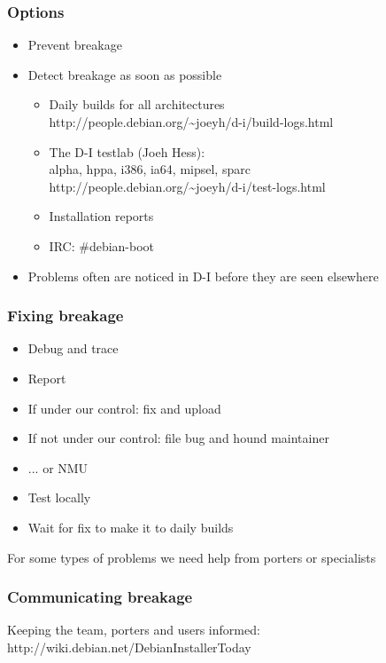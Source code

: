 \documentclass{beamer}
\begin{document}
\begin{frame}
  \frametitle{Options}
	\begin{itemize}[<+->]
	\item
		Prevent breakage
	\item
		Detect breakage as soon as possible
		\begin{itemize}
		\item
			Daily builds for all architectures \\
			http://people.debian.org/\~{}joeyh/d-i/build-logs.html
		\item
			The D-I testlab (Joeh Hess): \\
			alpha, hppa, i386, ia64, mipsel, sparc \\
			http://people.debian.org/\~{}joeyh/d-i/test-logs.html
		\item
			Installation reports
		\item
			IRC: \#debian-boot
		\end{itemize}
	\item
		Problems often are noticed in D-I before they are seen elsewhere
	\end{itemize}
\end{frame}

\begin{frame}
  \frametitle{Fixing breakage}
	\begin{itemize}[<+->]
	\item
		Debug and trace
	\item
		Report
	\item
		If under our control: fix and upload
	\item
		If not under our control: file bug and hound maintainer
	\item
		... or NMU
	\item
		Test locally
	\item
		Wait for fix to make it to daily builds
	\end{itemize}

For some types of problems we need help from porters or specialists
\end{frame}

\begin{frame}
  \frametitle{Communicating breakage}
Keeping the team, porters and users informed: \\
http://wiki.debian.net/DebianInstallerToday
\end{frame}
\end{document}
